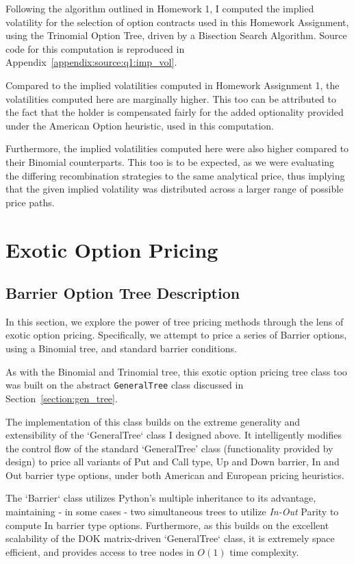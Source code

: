 \documentclass[10pt]{article}
\begin{document}
        Following the algorithm outlined in Homework 1, I computed the implied volatility for the selection of option contracts used in this Homework Assignment, using the Trinomial Option Tree, driven by a Bisection Search Algorithm. Source code for this computation is reproduced in Appendix~\ref{appendix:source:q1:imp_vol}.
    
        Compared to the implied volatilities computed in Homework Assignment 1, the volatilities computed here are marginally higher. This too can be attributed to the fact that the holder is compensated fairly for the added optionality provided under the American Option heuristic, used in this computation.

        Furthermore, the implied volatilities computed here were also higher compared to their Binomial counterparts. This too is to be expected, as we were evaluating the differing recombination strategies to the same analytical price, thus implying that the given implied volatility was distributed across a larger range of possible price paths.

\newpage
\section{Exotic Option Pricing}

    \subsection{Barrier Option Tree Description}

    In this section, we explore the power of tree pricing methods through the lens of exotic option pricing. Specifically, we attempt to price a series of Barrier options, using a Binomial tree, and standard barrier conditions.

    As with the Binomial and Trinomial tree, this exotic option pricing tree class too was built on the abstract \texttt{GeneralTree} class discussed in Section~\ref{section:gen_tree}.

    The implementation of this class builds on the extreme generality and extensibility of the `GeneralTree` class I designed above. It intelligently modifies the control flow of the standard `GeneralTree' class (functionality provided by design) to price all variants of Put and Call type, Up and Down barrier, In and Out barrier type options, under both American and European pricing heuristics.

    The `Barrier` class utilizes Python's multiple inheritance to its advantage, maintaining - in some cases - two simultaneous trees to utilize \textit{In-Out} Parity to compute In barrier type options. Furthermore, as this builds on the excellent scalability of the DOK matrix-driven `GeneralTree` class, it is extremely space efficient, and provides access to tree nodes in $O(1)$ time complexity.
\end{document}
